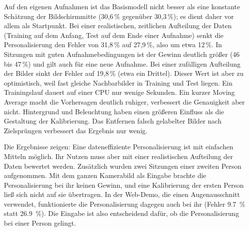 Auf den eigenen Aufnahmen ist das Basismodell nicht besser als eine konstante
Schätzung der Bildschirmmitte (30,6\,\% gegenüber 30,3\,\%); es dient daher
vor allem als Startpunkt. Bei einer realistischen, zeitlichen Aufteilung der
Daten (Training auf dem Anfang, Test auf dem Ende einer Aufnahme) senkt die
Personalisierung den Fehler von 31,8\,\% auf 27,9\,\%, also um etwa 12\,\%.
In Sitzungen mit guten Aufnahmebedingungen ist der Gewinn deutlich größer (46
bis 47\,\%) und gilt auch für eine neue Aufnahme. Bei einer zufälligen
Aufteilung der Bilder sinkt der Fehler auf 19,8\,\% (etwa ein Drittel). Dieser
Wert ist aber zu optimistisch, weil fast gleiche Nachbarbilder in Training und
Test liegen. Ein Trainingslauf dauert auf einer CPU nur wenige Sekunden. Ein kurzer Moving
Average macht die Vorhersagen deutlich ruhiger, verbessert die Genauigkeit aber
nicht. Hintergrund und Beleuchtung haben einen größeren Einfluss als die
Gestaltung der Kalibrierung. Das Entfernen falsch gelabelter Bilder nach
Zielsprüngen verbessert das Ergebnis nur wenig.

Die Ergebnisse zeigen: Eine dateneffiziente Personalisierung ist mit einfachen
Mitteln möglich. Ihr Nutzen muss aber mit einer realistischen Aufteilung der
Daten bewertet werden. Zusätzlich wurden zwei Sitzungen einer zweiten Person
aufgenommen. Mit dem ganzen Kamerabild als Eingabe brachte die Personalisierung
bei ihr keinen Gewinn, und eine Kalibrierung der ersten Person ließ sich nicht
auf sie übertragen. In der Web-Demo, die einen Augenausschnitt verwendet,
funktionierte die Personalisierung dagegen auch bei ihr (Fehler
\SI{9,7}{\percent} statt \SI{26,9}{\percent}). Die Eingabe ist also
entscheidend dafür, ob die Personalisierung bei einer Person gelingt.


